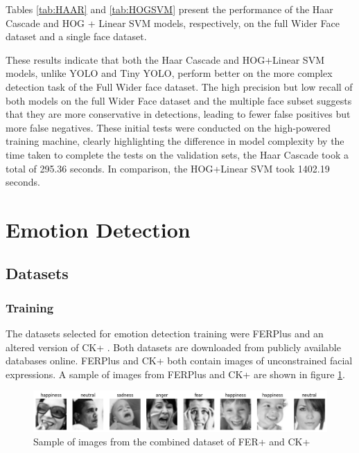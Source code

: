 Tables \ref{tab:HAAR} and \ref{tab:HOGSVM} present the performance of the Haar Cascade and HOG + Linear SVM models, respectively, on the full Wider Face dataset and a single face dataset.

These results indicate that both the Haar Cascade and HOG+Linear SVM models, unlike YOLO and Tiny YOLO, perform better on the more complex detection task of the Full Wider face dataset. The high precision but low recall of both models on the full Wider Face dataset and the multiple face subset suggests that they are more conservative in detections, leading to fewer false positives but more false negatives. These initial tests were conducted on the high-powered training machine, clearly highlighting the difference in model complexity by the time taken to complete the tests on the validation sets, the Haar Cascade took a total of 295.36 seconds. In comparison, the HOG+Linear SVM took 1402.19 seconds.

\section{Emotion Detection}
\subsection{Datasets}
\subsubsection{Training}

The datasets selected for emotion detection training were FERPlus \cite{BarsoumICMI2016} and an altered version of CK+ \cite{5543262}. Both datasets are downloaded from publicly available databases online. FERPlus and CK+ both contain images of unconstrained facial expressions. A sample of images from FERPlus and CK+ are shown in figure \ref{figure:sample_imgs}. 

\begin{figure}[!htb]
    \centering 
    \includegraphics[scale=0.5]{fed_images/random_imgs.png}
    \caption{Sample of images from the combined dataset of FER+ and CK+}
    \label{figure:sample_imgs}
\end{figure}

